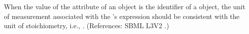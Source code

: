 When the value of the attribute  of an \EventAssignment
object is the identifier of a \SpeciesReference object, the unit of
measurement associated with the \EventAssignment's  expression
should be consistent with the unit of stoichiometry, i.e.,
.  (References: SBML L3V2
.)
